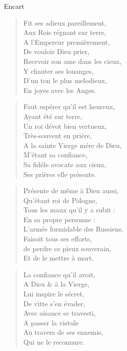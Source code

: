 \begin{diary}{Encart}{}
        \begin{verse}Fit ses adieux pareillement,\\Aux Rois régnant sur terre,\\A l'Empereur
                                 premièrement,\\De vouloir Dieu prier,\\Recevoir son ame dans les cieux,\\Y chanter ses louanges,\\D'un ton le plus melodieux,\\En joyes avec les Anges.\\\end{verse}
        \bigskip
        
        \begin{verse}Faut espérer qu'il est heureux,\\Ayant été sur terre,\\Un roi dévot bien
                                 vertueux,\\Très-souvent en priére,\\A la sainte Vierge mére de Dieu,\\M’étant sa confiance,\\Sa fidéle avocate aux cieux,\\Ses prières elle présente.\\\end{verse}
        \bigskip
        
        \begin{verse}Présente de même à Dieu aussi,\\Qu’étant roi de Pologne,\\Tous les maux qu’il y a subit :\\En sa propre personne :\\L'armée formidable des Russiens,\\Faisoit tous ses efforts,\\de perdre ce pieux souverain,\\Et de le mettre à mort.\\\end{verse}
        \bigskip
        
        \begin{verse}La confiance qu'il avoit,\\A Dieu & à la Vierge,\\Lui inspire le sécret,\\De vitte s'en évader,\\Avec aisance se travesti,\\A passer la vistule\\Au travers de ses ennemis,\\Qui ne le reconnure.\\\end{verse}
        \bigskip
        

\end{diary}
